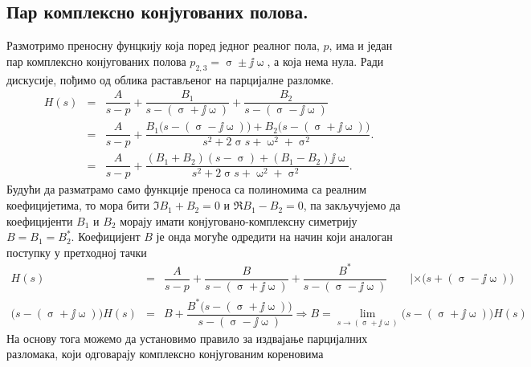 \begin{center}
\end{center}

\subsection{Пар комплексно конјугованих полова.}

Размотримо преносну фунцкију која поред једног реалног пола, $p$, има и један пар комплексно конјугованих полова
$p_{2,3} = \upsigma \pm \jj\upomega$, а која нема нула. Ради дискусије, пођимо од облика растављеног на парцијалне разломке. 
%
\begin{eqnarray}
    H(s) 
    &=& 
    \dfrac{A}{s - p} + 
    \dfrac{B_1}{s - (\upsigma + \jj\upomega)} + 
    \dfrac{B_2}{s - (\upsigma - \jj\upomega)} 
    \\
    &=& 
    \dfrac{A}{s - p} + 
    \dfrac{
        B_1 \bigl( s - (\upsigma - \jj\upomega) \bigr)
        +
        B_2 \bigl( s - (\upsigma + \jj\upomega) \bigr)
     }{s^2 + 2 \upsigma s + \upomega^2 + \upsigma^2}.  \\[2mm] 
     &=&
     \dfrac{A}{s - p} + 
     \dfrac{
         (B_1 + B_2)(s - \upsigma) +   
         (B_1 - B_2)\jj\upomega
      }{s^2 + 2 \upsigma s + \upomega^2 + \upsigma^2}. 
\end{eqnarray}
%
Будући да разматрамо само функције преноса са полиномима са реалним коефицијетима, то мора бити 
$\Im{B_1 + B_2} = 0$ и $\Re{B_1 - B_2} = 0$, па закључујемо да коефицијенти $B_1$ и $B_2$ морају 
имати конјуговано-комплексну симетрију $B = B_1 = B_2^\ast$. Коефицијент $B$ је онда могуће 
одредити на начин који аналоган поступку у претходној тачки
\begin{eqnarray}
    H(s) 
    &=& 
    \dfrac{A}{s - p} + 
    \dfrac{B}{s - (\upsigma + \jj\upomega)} + 
    \dfrac{B^\ast}{s - (\upsigma - \jj\upomega)} \qquad | \times \bigl( s + (\upsigma - \jj\upomega) \bigr)
    \\
    \bigl( s - (\upsigma + \jj\upomega) \bigr)
    H(s) 
    &=& B + 
    \dfrac{
        B^\ast \bigl( s - (\upsigma + \jj\upomega) \bigr)
    }{s - (\upsigma - \jj\upomega)}
    \Rightarrow
    B = \lim_{{s \to (\upsigma + \jj\upomega)}}  \bigl( s - (\upsigma + \jj\upomega) \bigr)
    H(s) 
\end{eqnarray}
На основу тога можемо да установимо правило за издвајање парцијалних разломака, који одговарају 
комплексно конјугованим кореновима 

